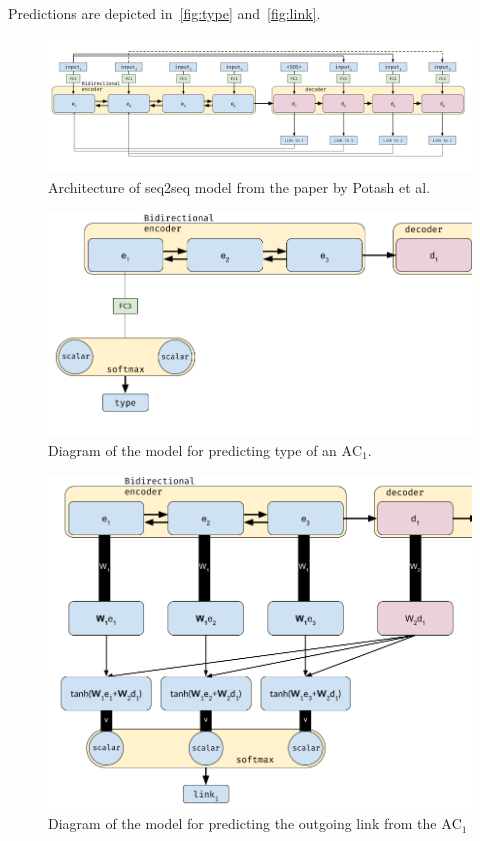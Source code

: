 \documentclass[onecolumn]{article}
\begin{document}
Predictions are depicted in~\autoref{fig:type} and~\ref{fig:link}.

\begin{figure}[h]
    \centering
    \includegraphics[width=0.8\linewidth]{fig/seq2seq.png}
    \caption{Architecture of seq2seq model from the paper by Potash et al.~\cite{potash2017here}}\label{fig:seq2seq}
\end{figure}

\begin{figure}[h]
    \centering
    \includegraphics[width=0.8\linewidth]{fig/type.png}
    \caption{Diagram of the model for predicting type of an $\text{AC}_1$.}\label{fig:seq2seq}
\end{figure}

\begin{figure}[h]
    \centering
    \includegraphics[width=0.8\linewidth]{fig/link.png}
\caption{Diagram of the model for predicting the outgoing link from the $\text{AC}_1$}\label{fig:seq2seq}
\end{figure}
\end{document}
